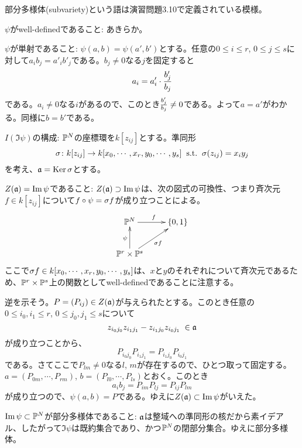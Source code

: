  \begin{rem}
   部分多様体(subvariety)という語は演習問題3.10で定義されている模様。
 \end{rem}




 $\psi$がwell-definedであること: あきらか。

 $\psi$が単射であること: $\psi(a,b)=\psi(a',b')$とする。任意の$0 \leq i \leq r$, $0 \leq j \leq s$に対して$a_ib_j = a'_ib'_j$である。$b_j \neq 0$なる$j$を固定すると
 \[
 a_i = a'_i \cdot \f{b'_j}{b_j}
 \]
 である。$a_i \neq 0$なる$i$があるので、このとき$\f{b'_j}{b_j} \neq 0$である。よって$a = a'$がわかる。同様に$b = b'$である。

 $I(\Im \psi)$の構成: $\P^N$の座標環を$k[z_{ij}]$とする。準同形
 \[
 \grs \colon k[z_{ij}] \to k[x_0, \cdots , x_r, y_0, \cdots , y_s] \st \grs(z_{ij}) = x_i y_j
 \]
 を考え、$\fraka = \Ker \grs$とする。

 $Z(\fraka )=\Im \psi$であること: $Z(\fraka ) \supset \Im \psi$は、次の図式の可換性、つまり斉次元$f \in k[z_{ij}]$について$f \circ \psi = \grs f$が成り立つことによる。
 \[
 \xymatrix{
 \P^N \ar[r]^f & \{ 0, 1 \} \\
 \P^r \tm \P^s \ar[u]^{\psi} \ar[ur]_{\grs f} & {}
 }
 \]
 ここで$\grs f \in k[x_0, \cdots , x_r, y_0 , \cdots , y_s]$は、$x$と$y$のそれぞれについて斉次元であるため、$\P^r \tm \P^s$上の関数としてwell-definedであることに注意する。

 逆を示そう。$P = (P_{ij}) \in Z(\fraka)$が与えられたとする。このとき任意の$0 \leq i_0, i_1 \leq r$, $0 \leq j_0, j_1 \leq s$について
 \[
 z_{i_0 j_0} z_{i_1 j_1} -  z_{i_1 j_0} z_{i_0 j_1} \; \in \fraka
 \]
 が成り立つことから、
 \[
 P_{i_0 j_0} P_{i_1 j_1} =  P_{i_1 j_0} P_{i_0 j_1}
 \]
 である。さてここで$P_{lm} \neq 0$なる$l$, $m$が存在するので、ひとつ取って固定する。$a = (P_{0m}, \cdots , P_{rm})$, $b = (P_{l0}, \cdots , P_{ls})$とおく。このとき
 \[
 a_i b_j = P_{im} P_{lj} = P_{ij} P_{lm}
 \]
 が成り立つので、$\psi(a,b)=P$である。ゆえに$Z(\fraka ) \subset \Im \psi$がいえた。

 $\Im \psi \subset \P^N$が部分多様体であること: $\fraka$は整域への準同形の核だから素イデアル、したがって$\Im \psi$は既約集合であり、かつ$\P^N$の閉部分集合。ゆえに部分多様体。

